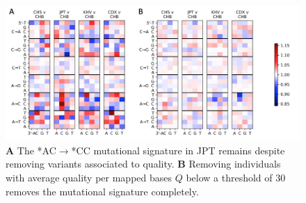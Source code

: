 \documentclass[9pt,lineno]{elife}
\begin{document}
\begin{figure}[h]
\includegraphics[width=\hsize,keepaspectratio]{./Figures/MutationSpectrum_cutOff.png}
\caption{\textbf{A} 
The  *AC${\rightarrow}$*CC mutational signature in JPT remains despite removing variants associated to quality. 
\textbf{B} 
Removing individuals with average quality per mapped bases $Q$ below a threshold of 30 removes the mutational signature completely. }
\label{MutSpect}
\end{figure}
\end{document}
